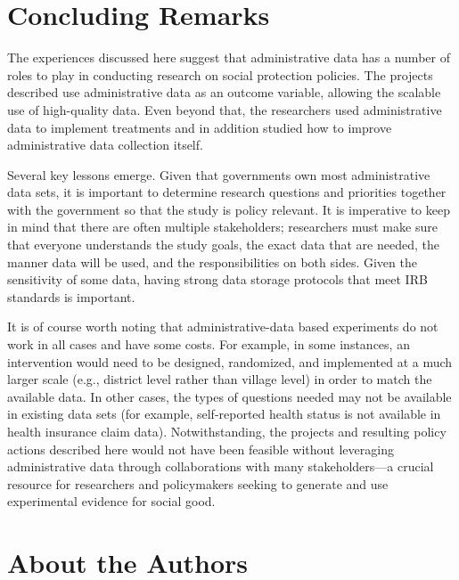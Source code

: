 \hypertarget{concluding-remarks-5}{%
\section{Concluding Remarks}\label{concluding-remarks-5}}

The experiences discussed here suggest that administrative data has a number of roles to play in conducting research on social protection policies. The projects described use administrative data as an outcome variable, allowing the scalable use of high-quality data. Even beyond that, the researchers used administrative data to implement treatments and in addition studied how to improve administrative data collection itself.

Several key lessons emerge. Given that governments own most administrative data sets, it is important to determine research questions and priorities together with the government so that the study is policy relevant. It is imperative to keep in mind that there are often multiple stakeholders; researchers must make sure that everyone understands the study goals, the exact data that are needed, the manner data will be used, and the responsibilities on both sides. Given the sensitivity of some data, having strong data storage protocols that meet IRB standards is important.

It is of course worth noting that administrative-data based experiments do not work in all cases and have some costs. For example, in some instances, an intervention would need to be designed, randomized, and implemented at a much larger scale (e.g., district level rather than village level) in order to match the available data. In other cases, the types of questions needed may not be available in existing data sets (for example, self-reported health status is not available in health insurance claim data). Notwithstanding, the projects and resulting policy actions described here would not have been feasible without leveraging administrative data through collaborations with many stakeholders---a crucial resource for researchers and policymakers seeking to generate and use experimental evidence for social good.

\hypertarget{about-the-authors-10}{%
\section*{About the Authors}\label{about-the-authors-10}}

